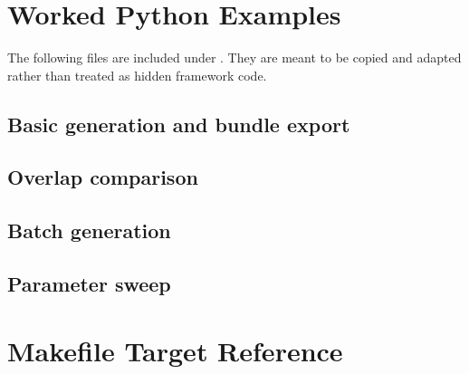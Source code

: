 \documentclass[11pt,oneside]{report}
\begin{document}
\chapter{Worked Python Examples}

The following files are included under . They are meant
to be copied and adapted rather than treated as hidden framework code.

\section{Basic generation and bundle export}


\section{Overlap comparison}


\section{Batch generation}


\section{Parameter sweep}


\appendix
\chapter{Makefile Target Reference}
\end{document}
